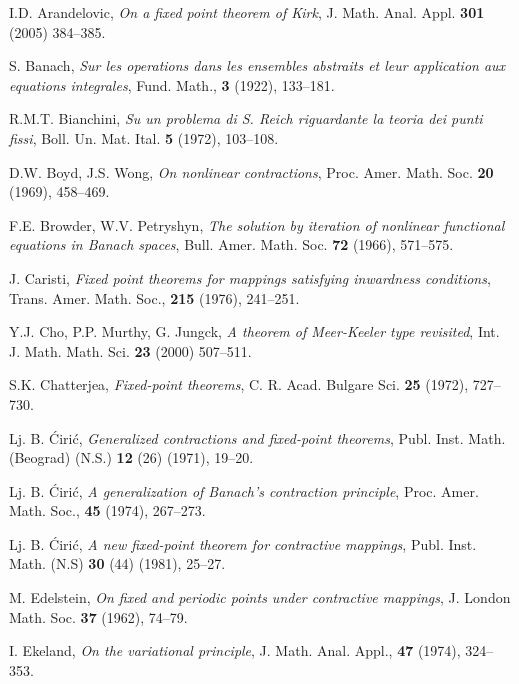\documentclass[a4paper,10pt,twoside,reqno]{amsart}
\theoremstyle{definition}
\theoremstyle{remark}
\numberwithin{equation}{section}
\begin{document}
\begin{thebibliography}{99}

  I.D. Arandelovic,
  \textit{On a fixed point theorem of Kirk},
  J. Math. Anal. Appl. \textbf{301} (2005) 384--385.

  S. Banach,
  \textit{Sur les operations dans les ensembles abstraits et leur application aux equations
  integrales},
  Fund. Math., \textbf{3} (1922), 133--181.

  R.M.T. Bianchini,
  \textit{Su un problema di S. Reich riguardante la teoria dei punti fissi},
  Boll. Un. Mat. Ital. \textbf{5} (1972), 103--108.

  D.W. Boyd, J.S. Wong,
  \textit{On nonlinear contractions},
  Proc. Amer. Math. Soc. \textbf{20} (1969), 458--469.

  F.E. Browder, W.V. Petryshyn,
  \textit{The solution by iteration of nonlinear functional equations in Banach spaces},
  Bull. Amer. Math. Soc. \textbf{72} (1966), 571--575.

  J. Caristi,
  \textit{Fixed point theorems for mappings satisfying inwardness conditions},
  Trans. Amer. Math. Soc., \textbf{215} (1976), 241--251.

  Y.J. Cho, P.P. Murthy, G. Jungck,
  \textit{A theorem of Meer-Keeler type revisited},
  Int. J. Math. Math. Sci. \textbf{23} (2000) 507--511.

  S.K. Chatterjea,
  \textit{Fixed-point theorems},
  C. R. Acad. Bulgare Sci. \textbf{25} (1972), 727--730.

  Lj. B. \'Ciri\'c,
  \textit{Generalized contractions and fixed-point theorems},
  Publ. Inst. Math. (Beograd) (N.S.) \textbf{12} (26) (1971), 19--20.

  Lj. B. \'Ciri\'c,
  \textit{A generalization of Banach's contraction principle},
  Proc. Amer. Math. Soc., \textbf{45} (1974), 267--273.

  Lj. B. \'Ciri\'c,
  \textit{A new fixed-point theorem for contractive mappings},
  Publ. Inst. Math. (N.S) \textbf{30} (44) (1981), 25--27.

  M. Edelstein,
  \textit{On fixed and periodic points under contractive mappings},
  J. London Math. Soc. \textbf{37} (1962), 74--79.

  I. Ekeland,
  \textit{On the variational principle},
  J. Math. Anal. Appl., \textbf{47} (1974), 324--353.


\end{thebibliography}
\end{document}
